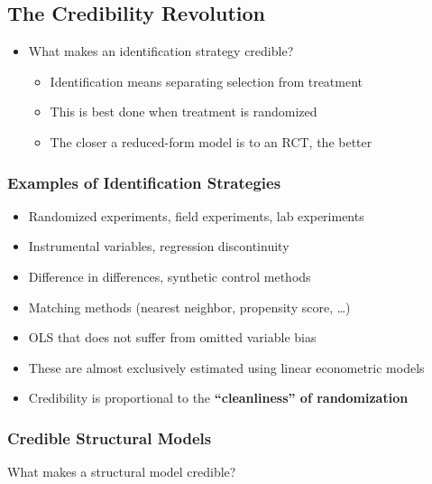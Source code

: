 \documentclass[11pt]{article}
\begin{document}
\subsection{The Credibility Revolution}
\label{sec:orgb3b70cd}

\begin{itemize}
\item What makes an identification strategy credible?
\begin{itemize}
\item Identification means separating selection from treatment
\item This is best done when treatment is randomized
\item The closer a reduced-form model is to an RCT, the better
\end{itemize}
\end{itemize}

\subsubsection{Examples of Identification Strategies}
\label{sec:org24b6eab}

\begin{itemize}
\item Randomized experiments, field experiments, lab experiments
\item Instrumental variables, regression discontinuity
\item Difference in differences, synthetic control methods
\item Matching methods (nearest neighbor, propensity score, \ldots{})
\item OLS that does not suffer from omitted variable bias
\item These are almost exclusively estimated using linear econometric models
\item Credibility is proportional to the \textbf{``cleanliness'' of randomization}
\end{itemize}

\subsubsection{Credible Structural Models}
\label{sec:orgd9f9af4}

What makes a structural model credible?
\end{document}
